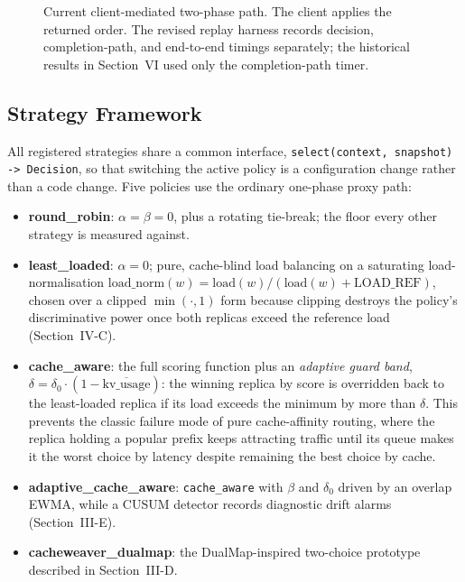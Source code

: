 \documentclass[conference]{IEEEtran}
\begin{document}
\begin{figure}[t]
\centering
{}
\caption{Current client-mediated two-phase path. The client applies the
returned order. The revised replay harness records decision,
completion-path, and end-to-end timings separately; the historical
results in Section~VI used only the completion-path timer.}
\label{fig:two-phase}
\end{figure}

\subsection{Strategy Framework}

All registered strategies share a common interface,
\texttt{select(context, snapshot) -> Decision}, so that switching the
active policy is a configuration change rather than a code change. Five
policies use the ordinary one-phase proxy path:

\begin{itemize}
  \item \textbf{round\_robin}: $\alpha{=}\beta{=}0$, plus a rotating
  tie-break; the floor every other strategy is measured against.
  \item \textbf{least\_loaded}: $\alpha{=}0$; pure, cache-blind load
  balancing on a saturating load-normalisation
  $\text{load\_norm}(w) = \text{load}(w) / (\text{load}(w) +
  \text{LOAD\_REF})$, chosen over a clipped $\min(\cdot,1)$ form because
  clipping destroys the policy's discriminative power once both
  replicas exceed the reference load (Section~IV-C).
  \item \textbf{cache\_aware}: the full scoring function plus an
  \emph{adaptive guard band}, $\delta = \delta_0 \cdot (1 -
  \overline{\text{kv\_usage}})$: the winning replica by score is
  overridden back to the least-loaded replica if its load exceeds the
  minimum by more than $\delta$. This prevents the classic failure
  mode of pure cache-affinity routing, where the replica holding a
  popular prefix keeps attracting traffic until its queue makes it the
  worst choice by latency despite remaining the best choice by cache.
  \item \textbf{adaptive\_cache\_aware}: \texttt{cache\_aware} with
  $\beta$ and $\delta_0$ driven by an overlap EWMA, while a CUSUM
  detector records diagnostic drift alarms (Section~III-E).
  \item \textbf{cacheweaver\_dualmap}: the DualMap-inspired two-choice
  prototype
  described in Section~III-D.
\end{itemize}
\end{document}
